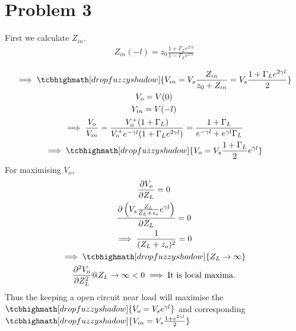 \documentclass{article}
\begin{document}
\section*{\hfil Problem 3}
First we calculate $Z_{in}$.
\begin{gather*}
Z_{in}(-l) = z_0\frac{1 + \Gamma _Le^{2\gamma l}}{1 - \Gamma _Le^{2\gamma l}}\\
\end{gather*}
\begin{gather}
\implies \tcbhighmath[drop fuzzy shadow]{V_{in} = V_s\frac{Z_{in}}{z_0 + Z_{in}} = V_s\frac{1 + \Gamma _Le^{2\gamma l}}{2}}\\
V_o = V(0)\\
V_{in} = V(-l)\\
\implies \frac{V_o}{V_{in}} = \frac{V_o^+(1 + \Gamma _L)}{V_o^+e^{- \gamma l}(1 + \Gamma _L e^{2\gamma l})} = \frac{1 + \Gamma _L}{e^{- \gamma l} +e^{\gamma l} \Gamma _L}\\
\implies \tcbhighmath[drop fuzzy shadow]{V_o = V_s\frac{1 + \Gamma _L}{2}e^{\gamma l}}
\end{gather}
For maximising $V_o$,
\begin{gather}
	\frac{\partial V_o}{\partial Z_L} = 0\\
	\frac{\partial \left({V_s\frac{Z_L}{Z_L + z_o}e^{\gamma l}}\right)}{\partial Z_L} = 0\\
	\implies \frac{1}{(Z_L + z_o)^2} = 0\\
	\implies \tcbhighmath[drop fuzzy shadow]{Z_L \to \infty}\\
	\frac{\partial ^2 V_o}{\partial Z_L^2}  @ {Z_L \to \infty} < 0 \implies \text{It is local maxima.}
\end{gather}
Thus the keeping a open circuit near load will maximise the $\tcbhighmath[drop fuzzy shadow]{V_o = V_se^{\gamma l}}$ and corresponding $\tcbhighmath[drop fuzzy shadow]{V_{in} = V_s\frac{1 + e^{2\gamma l}}{2}}$
\end{document}
